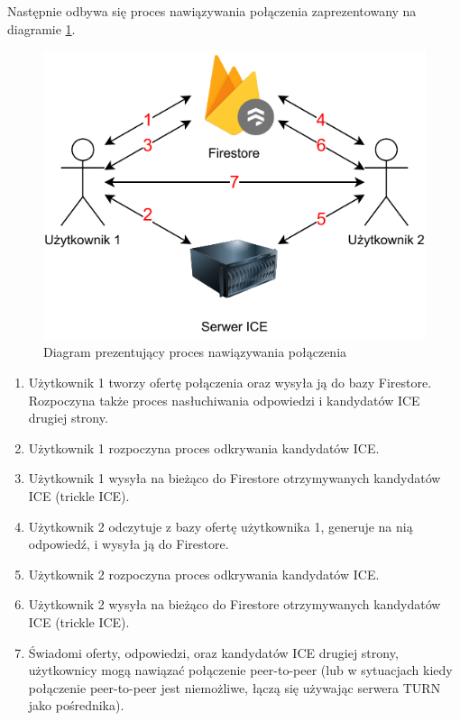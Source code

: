 Następnie odbywa się proces nawiązywania połączenia zaprezentowany na diagramie \ref{fig:webrtc_connection_init}.

\begin{figure}[H]
    \centering
    \includegraphics{img/webrtc-connection-init}
    \caption{Diagram prezentujący proces nawiązywania połączenia}
    \label{fig:webrtc_connection_init}
\end{figure}

\begin{enumerate}
    \item Użytkownik 1 tworzy ofertę połączenia oraz wysyła ją do bazy Firestore. Rozpoczyna także
          proces nasłuchiwania odpowiedzi i kandydatów ICE drugiej strony.
    \item Użytkownik 1 rozpoczyna proces odkrywania kandydatów ICE.
    \item Użytkownik 1 wysyła na bieżąco do Firestore otrzymywanych kandydatów ICE (trickle ICE).
    \item Użytkownik 2 odczytuje z bazy ofertę użytkownika 1, generuje na nią odpowiedź, i wysyła ją
          do Firestore.
    \item Użytkownik 2 rozpoczyna proces odkrywania kandydatów ICE.
    \item Użytkownik 2 wysyła na bieżąco do Firestore otrzymywanych kandydatów ICE (trickle ICE).
    \item Świadomi oferty, odpowiedzi, oraz kandydatów ICE drugiej strony, użytkownicy mogą nawiązać
          połączenie peer-to-peer (lub w sytuacjach kiedy połączenie peer-to-peer jest niemożliwe,
          łączą się używając serwera TURN jako pośrednika).
          
\end{enumerate}

